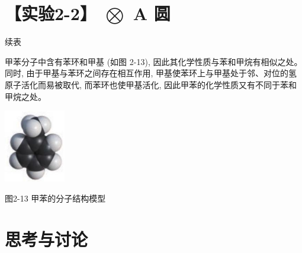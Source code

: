 \documentclass[10pt]{article}
\begin{document}
\section*{【实验2-2】 \(\bigotimes\) A 圆}

\begin{center}
\end{center}

续表

\begin{center}
\end{center}

甲苯分子中含有苯环和甲基 (如图 2-13), 因此其化学性质与苯和甲烷有相似之处。同时, 由于甲基与苯环之间存在相互作用, 甲基使苯环上与甲基处于邻、对位的氢原子活化而易被取代, 而苯环也使甲基活化, 因此甲苯的化学性质又有不同于苯和甲烷之处。

\begin{center}
\includegraphics[max width=0.2\textwidth]{images/0190efc5-b58a-7c43-bfb0-e0a030df9cfd_52_618403.jpg}
\end{center}

图2-13 甲苯的分子结构模型

\section*{思考与讨论}
\end{document}
